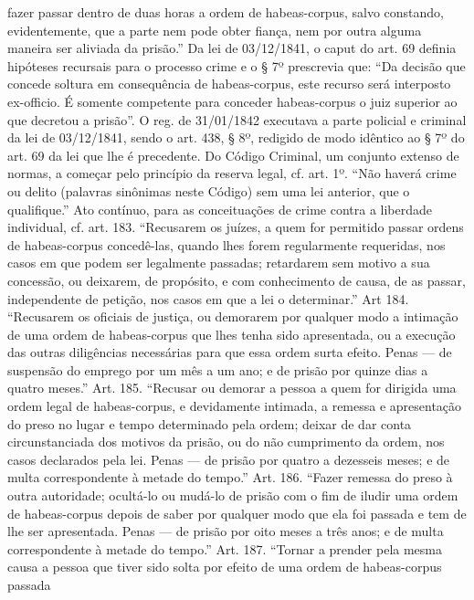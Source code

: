 {{  fazer passar dentro de duas horas a ordem de habeas-corpus, salvo
  constando, evidentemente, que a parte nem pode obter fiança, nem por
  outra alguma maneira ser aliviada da prisão.'' Da lei de 03/12/1841, o
  caput do art. 69 definia hipóteses recursais para o processo crime e o
  § 7º prescrevia que: ``Da decisão que concede soltura em consequência
  de habeas-corpus, este recurso será interposto ex-officio. É somente
  competente para conceder habeas-corpus o juiz superior ao que decretou
  a prisão''. O reg. de 31/01/1842 executava a parte policial e criminal
  da lei de 03/12/1841, sendo o art. 438, § 8º, redigido de modo
  idêntico ao § 7º do art. 69 da lei que lhe é precedente. Do Código
  Criminal, um conjunto extenso de normas, a começar pelo princípio da
  reserva legal, cf. art. 1º. ``Não haverá crime ou delito (palavras
  sinônimas neste Código) sem uma lei anterior, que o qualifique.'' Ato
  contínuo, para as conceituações de crime contra a liberdade
  individual, cf. art. 183. ``Recusarem os juízes, a quem for permitido
  passar ordens de habeas-corpus concedê-las, quando lhes forem
  regularmente requeridas, nos casos em que podem ser legalmente
  passadas; retardarem sem motivo a sua concessão, ou deixarem, de
  propósito, e com conhecimento de causa, de as passar, independente de
  petição, nos casos em que a lei o determinar.'' Art 184. ``Recusarem
  os oficiais de justiça, ou demorarem por qualquer modo a intimação de
  uma ordem de habeas-corpus que lhes tenha sido apresentada, ou a
  execução das outras diligências necessárias para que essa ordem surta
  efeito. Penas --- de suspensão do emprego por um mês a um ano; e de
  prisão por quinze dias a quatro meses.'' Art. 185. ``Recusar ou
  demorar a pessoa a quem for dirigida uma ordem legal de habeas-corpus,
  e devidamente intimada, a remessa e apresentação do preso no lugar e
  tempo determinado pela ordem; deixar de dar conta circunstanciada dos
  motivos da prisão, ou do não cumprimento da ordem, nos casos
  declarados pela lei. Penas --- de prisão por quatro a dezesseis meses; e
  de multa correspondente à metade do tempo.'' Art. 186. ``Fazer remessa
  do preso à outra autoridade; ocultá-lo ou mudá-lo de prisão com o fim
  de iludir uma ordem de habeas-corpus depois de saber por qualquer modo
  que ela foi passada e tem de lhe ser apresentada. Penas --- de prisão
  por oito meses a três anos; e de multa correspondente à metade do
  tempo.'' Art. 187. ``Tornar a prender pela mesma causa a pessoa que
  tiver sido solta por efeito de uma ordem de habeas-corpus passada
}}
